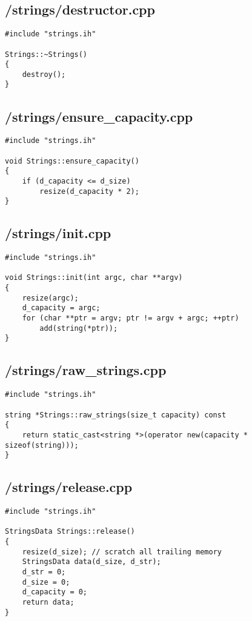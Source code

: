 \documentclass{article}
\begin{document}
\subsection*{/strings/destructor.cpp}
\begin{verbatim}
#include "strings.ih"

Strings::~Strings()
{
    destroy();
}
\end{verbatim}
\subsection*{/strings/ensure\_capacity.cpp}
\begin{verbatim}
#include "strings.ih"

void Strings::ensure_capacity()
{
    if (d_capacity <= d_size)
        resize(d_capacity * 2);
}
\end{verbatim}
\subsection*{/strings/init.cpp}
\begin{verbatim}
#include "strings.ih"

void Strings::init(int argc, char **argv)
{
    resize(argc);
    d_capacity = argc;
    for (char **ptr = argv; ptr != argv + argc; ++ptr)
        add(string(*ptr));
}
\end{verbatim}
\subsection*{/strings/raw\_strings.cpp}
\begin{verbatim}
#include "strings.ih"

string *Strings::raw_strings(size_t capacity) const
{
    return static_cast<string *>(operator new(capacity * sizeof(string)));
}
\end{verbatim}
\subsection*{/strings/release.cpp}
\begin{verbatim}
#include "strings.ih"

StringsData Strings::release()
{
    resize(d_size); // scratch all trailing memory
    StringsData data(d_size, d_str);
    d_str = 0;
    d_size = 0;
    d_capacity = 0;
    return data;
}
\end{verbatim}
\end{document}
